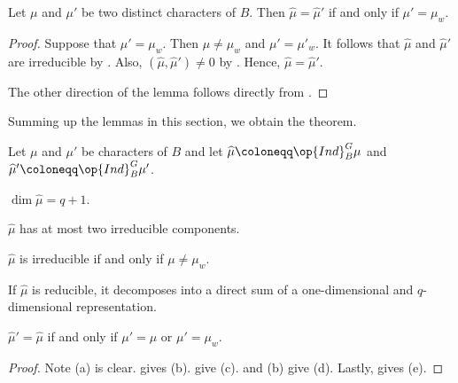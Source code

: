\documentclass[../main.tex]{subfiles}
\begin{document}
\begin{lemma} \label{lem:mu-hat-interference-full}
	Let $\mu$ and $\mu'$ be two distinct characters of $B$. Then $\widehat\mu=\widehat\mu'$ if and only if $\mu'=\mu_w$.
\end{lemma}
\begin{proof}
	Suppose that $\mu'=\mu_w$. Then $\mu\ne\mu_w$ and $\mu'=\mu'_w$. It follows that $\widehat\mu$ and $\widehat\mu'$ are irreducible by . Also, $\left(\widehat\mu,\widehat\mu'\right)\ne0$ by . Hence, $\widehat\mu=\widehat\mu'$.

	The other direction of the lemma follows directly from .
\end{proof}
Summing up the lemmas in this section, we obtain the theorem.
\begin{theorem} \label{thm:fully-decompose-mu-hat}
	Let $\mu$ and $\mu'$ be characters of $B$ and let $\widehat\mu\coloneqq\op{Ind}^G_B\mu$ and $\widehat\mu'\coloneqq\op{Ind}^G_B\mu'$.
	\begin{listalph}
		\item $\dim\widehat\mu=q+1$.
		\item $\widehat\mu$ has at most two irreducible components.
		\item $\widehat\mu$ is irreducible if and only if $\mu\ne\mu_w$.
		\item If $\widehat\mu$ is reducible, it decomposes into a direct sum of a one-dimensional and $q$-dimensional representation.
		\item $\widehat\mu'=\widehat\mu$ if and only if $\mu'=\mu$ or $\mu'=\mu_w$.
	\end{listalph}
\end{theorem}
\begin{proof}
	Note (a) is clear.  gives (b).  give (c).  and (b) give (d). Lastly,  gives (e).
\end{proof}
\end{document}
